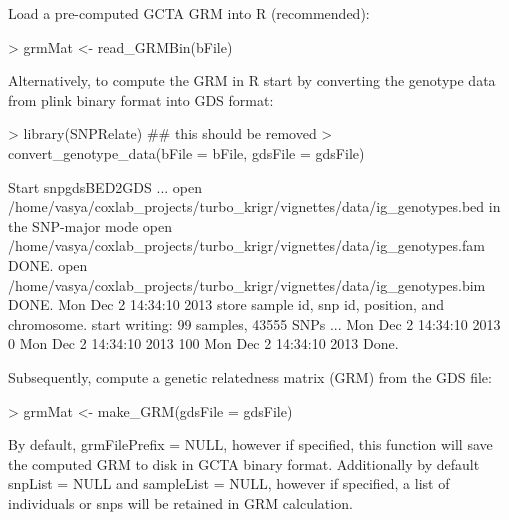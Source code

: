 \documentclass[a4paper]{article}
\begin{document}
Load a pre-computed GCTA GRM into R (recommended):
\begin{Schunk}

\begin{Schunk}
\begin{Sinput}
> grmMat <- read_GRMBin(bFile)
\end{Sinput}
\end{Schunk}

\end{Schunk}
Alternatively, to compute the GRM in R start by converting the genotype data from plink binary format into GDS format:
\begin{Schunk}

\begin{Schunk}
\begin{Sinput}
> library(SNPRelate) ## this should be removed
> convert_genotype_data(bFile = bFile, gdsFile = gdsFile)
\end{Sinput}
\begin{Soutput}
Start snpgdsBED2GDS ...
	open /home/vasya/coxlab_projects/turbo_krigr/vignettes/data/ig_genotypes.bed in the SNP-major mode
	open /home/vasya/coxlab_projects/turbo_krigr/vignettes/data/ig_genotypes.fam DONE.
	open /home/vasya/coxlab_projects/turbo_krigr/vignettes/data/ig_genotypes.bim DONE.
Mon Dec  2 14:34:10 2013 	store sample id, snp id, position, and chromosome.
	start writing: 99 samples, 43555 SNPs ...
 	Mon Dec  2 14:34:10 2013	0%
 	Mon Dec  2 14:34:10 2013	100%
Mon Dec  2 14:34:10 2013 	Done.
\end{Soutput}
\end{Schunk}

\end{Schunk}
Subsequently, compute a genetic relatedness matrix (GRM) from the GDS file: 
\begin{Schunk}

\begin{Schunk}
\begin{Sinput}
> grmMat <- make_GRM(gdsFile = gdsFile)
\end{Sinput}
\end{Schunk}

\end{Schunk}
By default, grmFilePrefix = NULL, however if specified, this function will save the computed GRM to disk in GCTA binary format. Additionally by default snpList = NULL and sampleList = NULL, however if specified, a list of individuals or snps will be retained in GRM calculation.
\\
\\
\end{document}
